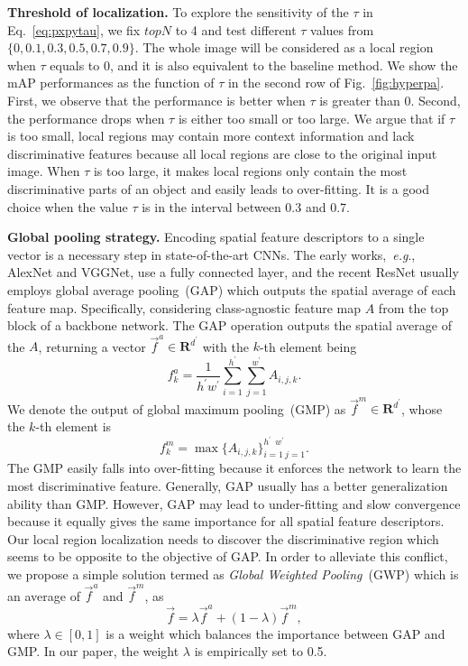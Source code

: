\documentclass[journal]{IEEEtran}
\makeatletter
\DeclareRobustCommand\onedot{\@onedot}
\def\@onedot{.}
\def\eg{\emph{e.g}\onedot}
\makeatother
\begin{document}
\noindent \textbf{Threshold of localization.} To explore the sensitivity of the $\tau$ in Eq.~\ref{eq:pxpytau}, we fix $topN$ to 4 and test different $\tau$ values from $\{0, 0.1, 0.3, 0.5, 0.7, 0.9\}$. The whole image will be considered as a local region when $\tau$ equals to 0, and it is also equivalent to the  baseline method. We show the mAP performances as the function of $\tau$ in the second row of Fig.~\ref{fig:hyperpa}.
First, we observe that the performance is better when $\tau$ is greater than 0. Second, the performance drops when $\tau$ is either too small or too large. We argue that if $\tau$ is too small, local regions may contain more context information and lack discriminative features because all local regions are close to the original input image.  When $\tau$ is too large, it makes local regions only contain the most discriminative parts of an object and easily leads to over-fitting. It is a good choice when the value $\tau$ is in the interval between 0.3 and 0.7.

\noindent \textbf{Global pooling strategy.}  Encoding spatial feature descriptors to a single vector is a necessary step in state-of-the-art CNNs. The early works,~\eg, AlexNet and VGGNet, use a fully connected layer, and the recent ResNet usually employs global average pooling~(GAP) which outputs the spatial average of each feature map.  Specifically, considering class-agnostic feature map $A$ from the top block of a backbone network. The GAP operation outputs the spatial average of the $A$, returning a vector $\vec f^{a} \in {\mathbf{R}^{d^\prime}}$  with the $k$-th element being
\begin{equation}
f_k^{a} = \frac{1}{h^\prime w^\prime} \sum_{i=1}^{h^\prime}\sum_{j=1}^{w^\prime}  A_{i,j,k}.
\end{equation}  
We denote the output of global maximum pooling~(GMP) as $\vec f^{m}\in {\mathbf{R}^{d^\prime}}$, whose the $k$-th element is 
\begin{equation}
 f_k^{m} = \max \{A_{i,j,k}\}_{i=1~j=1}^{h^\prime~~w^\prime}.
\end{equation} The GMP easily falls into over-fitting because it enforces the network to learn the most discriminative feature. Generally, GAP usually has a better generalization ability than GMP. However, GAP may lead to under-fitting and slow convergence because it equally gives the same importance for all spatial feature descriptors. Our local region localization needs to discover the discriminative region which seems to be opposite to the objective of GAP. In order to alleviate this conflict, we propose a simple solution termed as \emph{Global Weighted Pooling}~(GWP) which is an average of $\vec f^a$ and $\vec f^m$, as 
\begin{equation}
\vec f= \lambda \vec f^a + (1-\lambda)  \vec f^m,
\end{equation}  
where $\lambda \in [0,1]$ is a weight which balances the importance between GAP and GMP. In our paper, the weight $\lambda$ is empirically set to 0.5.
\end{document}

